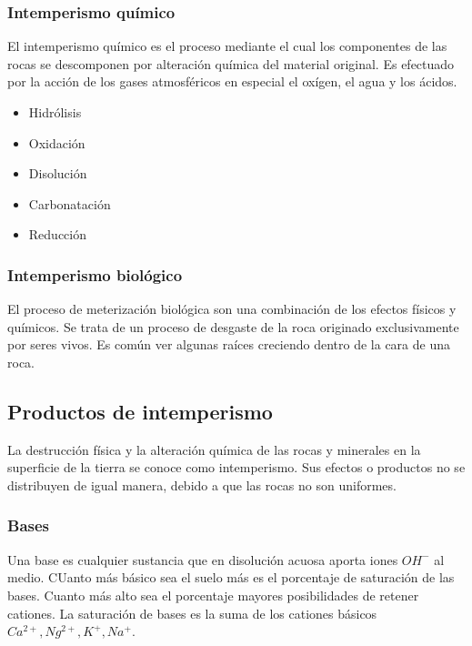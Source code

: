 \subsubsection{Intemperismo químico}
El intemperismo químico es el proceso mediante el cual los componentes de las rocas se descomponen por alteración química del material original. Es efectuado por la acción de los gases atmosféricos en especial el oxígen, el agua y los ácidos.
\begin{itemize}
    \item Hidrólisis
    \item Oxidación
    \item Disolución
    \item Carbonatación
    \item Reducción
\end{itemize}
\subsubsection{Intemperismo biológico}
El proceso de meterización biológica son una combinación de los efectos físicos y químicos. Se trata de un proceso de desgaste de la roca originado exclusivamente por seres vivos. Es común ver algunas raíces creciendo dentro de la cara de una roca.
\subsection{Productos de intemperismo}

La destrucción física y la alteración química de las rocas y minerales en la superficie de la tierra se conoce como intemperismo. Sus efectos o productos no se distribuyen de igual manera, debido a que las rocas no son uniformes.

\subsubsection{Bases}
Una base es cualquier sustancia que en disolución acuosa aporta iones $OH^{-}$ al medio. CUanto más básico sea el suelo más es el porcentaje de saturación de las bases. Cuanto más alto sea el porcentaje mayores posibilidades de retener cationes.
La saturación de bases es la suma de los cationes básicos $Ca^{2+}, Ng^{2+},K^{+},Na^{+}$.

